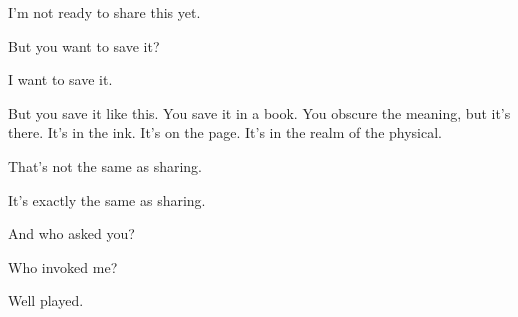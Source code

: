 \null

\vfill

\noindent I'm not ready to share this yet.

\begin{ally}
But you want to save it?
\end{ally}
I want to save it.

\begin{ally}
But you save it like this. You save it in a book. You obscure the meaning, but it's there. It's in the ink. It's on the page. It's in the realm of the physical.
\end{ally}
That's not the same as sharing.

\begin{ally}
It's exactly the same as sharing.
\end{ally}
And who asked you?

\begin{ally}
Who invoked me?
\end{ally}
Well played.

\vfill

\newpage
